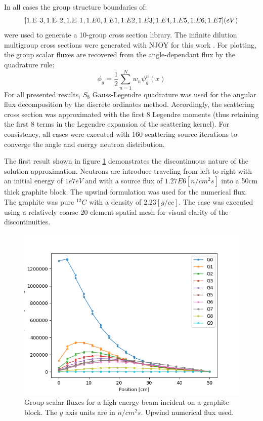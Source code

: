 
In all cases the group structure boundaries of:
\[
[1.\textsc{E-3} ,1.\textsc{E-2}, 1.\textsc{E-1}, 1.E0, 1.E1, 1.E2, 1.E3, 1.E4, 1.E5, 1.E6, 1.E7](eV)
\]
were used to generate a 10-group cross section library.  The infinite dilution multigroup cross sections were generated with NJOY for this work \cite{mac17}.
For plotting, the group scalar fluxes are recovered from the angle-dependant flux by the quadrature rule:
\begin{equation}
\phi_g = \frac{1}{2}\sum_{n=1}^N w_n \psi_g^n(x)
\end{equation}
For all presented results, $S_8$ Gauss-Legendre quadrature was used for the angular flux decomposition by the discrete ordinates method.  Accordingly, the scattering cross section was approximated with the first $8$ Legendre moments (thus retaining the first 8 terms in the Legendre expansion of the scattering kernel).  For consistency, all cases were executed with 160 scattering source iterations to converge the angle and energy neutron distribution.

The first result shown in figure \ref{gb_1} demonstrates the discontinuous nature of the solution approximation.  Neutrons are introduce traveling from left to right with an initial energy of $1e7eV$ and with a source flux of $1.27E6 [n/cm^2s]$ into a 50cm thick graphite block. The upwind formulation was used for the numerical flux.  The graphite was pure $^{12}C$ with a density of 2.23$[g/cc]$.  The case was executed using a relatively coarse 20 element spatial mesh for visual clarity of the discontinuities.

\begin{figure}[!htbp]
\centering
\includegraphics[width=12cm]{results/scflux_graphite_beam_1.png}
\caption{Group scalar fluxes for a high energy beam incident on a graphite block. The $y$ axis units are in $n/cm^2s$.  Upwind numerical flux used.}
\label{gb_1}
\end{figure}

